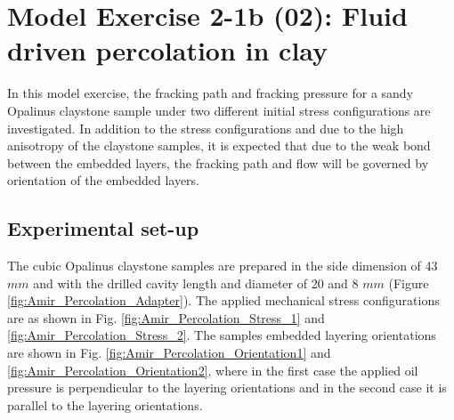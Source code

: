 \section{Model Exercise 2-1b (02): Fluid driven percolation in clay}
\label{sec:mex2-1b}
In this model exercise, the fracking path and fracking pressure for a sandy Opalinus claystone sample under two different initial stress configurations are investigated. In addition to the stress configurations and due to the high anisotropy of the claystone samples, it is expected that due to the weak bond between the embedded layers, the fracking path and flow will be governed by orientation of the embedded layers.  

\subsection{Experimental set-up}

The cubic Opalinus claystone samples are prepared in the side dimension of 43 $mm$ and with the drilled cavity length and diameter of 20 and 8 $mm$ (Figure \ref{fig:Amir_Percolation_Adapter}). The applied mechanical stress configurations are as shown in Fig. \ref{fig:Amir_Percolation_Stress_1} and \ref{fig:Amir_Percolation_Stress_2}. The samples embedded layering orientations are shown in Fig. \ref{fig:Amir_Percolation_Orientation1} and \ref{fig:Amir_Percolation_Orientation2}, where in the first case the applied oil pressure is perpendicular to the layering orientations and in the second case it is parallel to the layering orientations.

